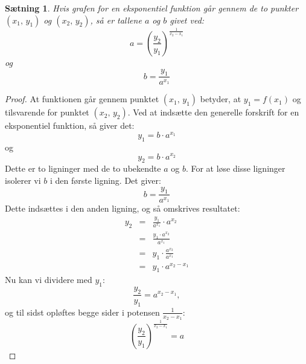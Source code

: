 \documentclass[12pt,oneside,a4paper]{article}
\newcommand{\bas}{\begin{eqnarray*}}
\newcommand{\eas}{\end{eqnarray*}}
\theoremstyle{plain}
\newtheorem*{thm}{Sætning}
\begin{document}
\begin{thm}
    Hvis grafen for en eksponentiel funktion går gennem de to punkter $(x_1,
    \,y_1)$ og $(x_2, \,y_2)$, så er tallene $a$ og $b$ givet ved:
    $$
    a = \left(\frac{y_2}{y_1}\right)^{\frac{1}{x_2-x_1}}
    $$
    og
    $$
    b = \frac{y_1}{a^{x_1}}
    $$
\end{thm}
\begin{proof}
    At funktionen går gennem punktet $(x_1, \,y_1)$ betyder, at $y_1 = f(x_1)$
    og tilsvarende for punktet $(x_2,\,y_2)$. Ved at indsætte den generelle
    forskrift for en eksponentiel funktion, så giver det:
    $$
    y_1 = b\cdot a^{x_1}
    $$
    og 
    $$
    y_2 = b \cdot a^{x_2}
    $$
    Dette er to ligninger med de to ubekendte $a$ og $b$. For at løse disse ligninger
    isolerer vi $b$ i den første ligning. Det giver:
    $$
    b = \frac{y_1}{a^{x_1}}
    $$
    Dette indsættes i den anden ligning, og så omskrives resultatet:
    \bas
    y_2 &=& \frac{y_1}{a^{x_1}} \cdot a^{x_2} \\
    &=& \frac{y_1 \cdot a^{x_2}}{a^{x_1}} \\
    &=& y_1 \cdot \frac{a^{x_2}}{a^{x_1}} \\
    &=& y_1 \cdot a^{x_2-x_1}
    \eas
    Nu kan vi dividere med $y_1$:
    $$
    \frac{y_2}{y_1} = a^{x_2-x_1},
    $$
    og til sidst opløftes begge sider i potensen $\frac{1}{x_2-x_1}$:
    $$
    \left(\frac{y_2}{y_1}\right)^{\frac{1}{x_2-x_1}} = a
    $$
\end{proof}
\end{document}
